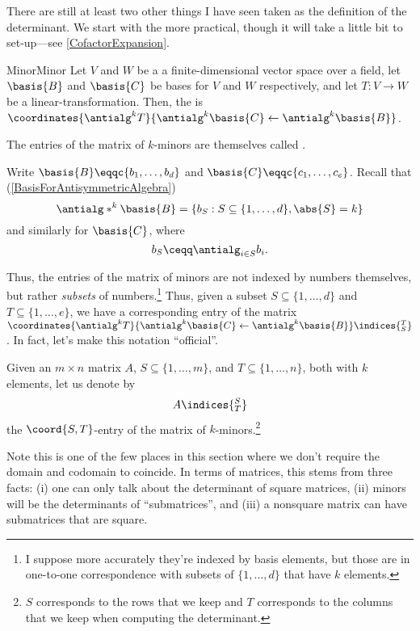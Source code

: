 There are still at least two other things I have seen taken as the definition of the determinant.  We start with the more practical, though it will take a little bit to set-up---see \cref{CofactorExpansion}.
\begin{dfn}{Minor}{Minor}
	Let $V$ and $W$ be a a finite-dimensional vector space over a field, let $\basis{B}$ and $\basis{C}$ be bases for $V$ and $W$ respectively, and let $T\colon V\rightarrow W$ be a linear-transformation.  Then, the  is $\coordinates{\antialg ^kT}{\antialg ^k\basis{C}\leftarrow \antialg ^k\basis{B}}$.
	\begin{rmk}
		The entries of the matrix of $k$-minors are themselves called .
	\end{rmk}
	\begin{rmk}
		Write $\basis{B}\eqqc \{ b_1,\ldots ,b_d\}$ and $\basis{C}\eqqc \{ c_1,\ldots ,c_e\}$.  Recall that (\cref{BasisForAntisymmetricAlgebra})
		\begin{equation}
			\antialg* ^k\basis{B}=\left\{ b_S:S\subseteq \{ 1,\ldots ,d\} ,\abs{S}=k\right\} 
		\end{equation}
		and similarly for $\basis{C}$, where
		\begin{equation}
			b_S\ceqq \antialg _{i\in S}b_i.
		\end{equation}
		
		Thus, the entries of the matrix of minors are not indexed by numbers themselves, but rather \emph{subsets} of numbers.\footnote{I suppose more accurately they're indexed by basis elements, but those are in one-to-one correspondence with subsets of $\{ 1,\ldots ,d\}$ that have $k$ elements.}  Thus, given a subset $S\subseteq \{ 1,\ldots ,d\}$ and $T\subseteq \{ 1,\ldots ,e\}$, we have a corresponding entry of the matrix $\coordinates{\antialg ^kT}{\antialg ^k\basis{C}\leftarrow \antialg ^k\basis{B}}\indices{^T_S}$.  In fact, let's make this notation ``official''.
		
		Given an $m\times n$ matrix $A$, $S\subseteq \{ 1,\ldots ,m\}$, and $T\subseteq \{ 1,\ldots ,n\}$, both with $k$ elements, let us denote by
		\begin{equation}
			A\indices{^S_T}
		\end{equation}
		the $\coord{S,T}$-entry of the matrix of $k$-minors.\footnote{$S$ corresponds to the rows that we keep and $T$ corresponds to the columns that we keep when computing the determinant.}
	\end{rmk}
	\begin{rmk}
		Note this is one of the few places in this section where we don't require the domain and codomain to coincide.  In terms of matrices, this stems from three facts:  (i) one can only talk about the determinant of square matrices, (ii) minors will be the determinants of ``submatrices'', and (iii) a nonsquare matrix can have submatrices that are square.
	\end{rmk}
\end{dfn}
